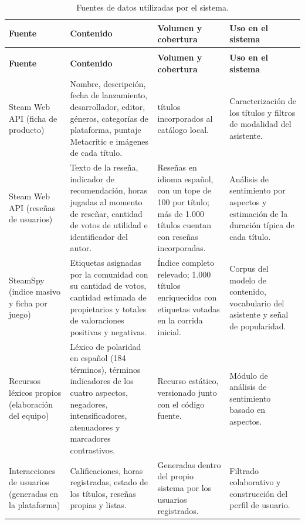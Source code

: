 \setlength{\tabcolsep}{4pt}
\begin{longtable}{|>{\raggedright\arraybackslash}p{2.3cm}|>{\raggedright\arraybackslash}p{3.7cm}|>{\raggedright\arraybackslash}p{3.2cm}|>{\raggedright\arraybackslash}p{3.2cm}|}
	\caption{Fuentes de datos utilizadas por el sistema.}\label{tab:fuentes_datos} \\
	\hline
	\textbf{Fuente} & \textbf{Contenido} & \textbf{Volumen y cobertura} & \textbf{Uso en el sistema} \\
	\hline
	\endfirsthead
	\multicolumn{4}{l}{\textit{Continuación de la Tabla \ref{tab:fuentes_datos}}} \\
	\hline
	\textbf{Fuente} & \textbf{Contenido} & \textbf{Volumen y cobertura} & \textbf{Uso en el sistema} \\
	\hline
	\endhead
	\hline
	\endfoot
	\hline
	\endlastfoot
	Steam Web API (ficha de producto) &
	Nombre, descripción, fecha de lanzamiento, desarrollador, editor, géneros, categorías de plataforma, puntaje Metacritic e imágenes de cada título. &
	6.430 títulos incorporados al catálogo local. &
	Caracterización de los títulos y filtros de modalidad del asistente. \\
	Steam Web API (reseñas de usuarios) &
	Texto de la reseña, indicador de recomendación, horas jugadas al momento de reseñar, cantidad de votos de utilidad e identificador del autor. &
	Reseñas en idioma español, con un tope de 100 por título; más de 1.000 títulos cuentan con reseñas incorporadas. &
	Análisis de sentimiento por aspectos y estimación de la duración típica de cada título. \\
	SteamSpy (índice masivo y ficha por juego) &
	Etiquetas asignadas por la comunidad con su cantidad de votos, cantidad estimada de propietarios y totales de valoraciones positivas y negativas. &
	Índice completo relevado; 1.000 títulos enriquecidos con etiquetas votadas en la corrida inicial. &
	Corpus del modelo de contenido, vocabulario del asistente y señal de popularidad. \\
	Recursos léxicos propios (elaboración del equipo) &
	Léxico de polaridad en español (184 términos), términos indicadores de los cuatro aspectos, negadores, intensificadores, atenuadores y marcadores contrastivos. &
	Recurso estático, versionado junto con el código fuente. &
	Módulo de análisis de sentimiento basado en aspectos. \\
	Interacciones de usuarios (generadas en la plataforma) &
	Calificaciones, horas registradas, estado de los títulos, reseñas propias y listas. &
	Generadas dentro del propio sistema por los usuarios registrados. &
	Filtrado colaborativo y construcción del perfil de usuario. \\
\end{longtable}
\setlength{\tabcolsep}{6pt}

